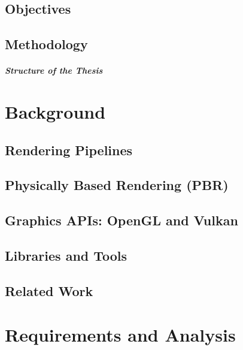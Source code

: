 \documentclass[12pt,a4paper,openright,twoside]{book}
\begin{document}
\section{Objectives}

\section{Methodology}

\paragraph{Structure of the Thesis}

\chapter{Background}
\label{chap:background}

\section{Rendering Pipelines}

\section{Physically Based Rendering (PBR)}

\section{Graphics APIs: OpenGL and Vulkan}

\section{Libraries and Tools}

\section{Related Work}

\chapter{Requirements and Analysis}
\label{chap:analysis}
\end{document}
